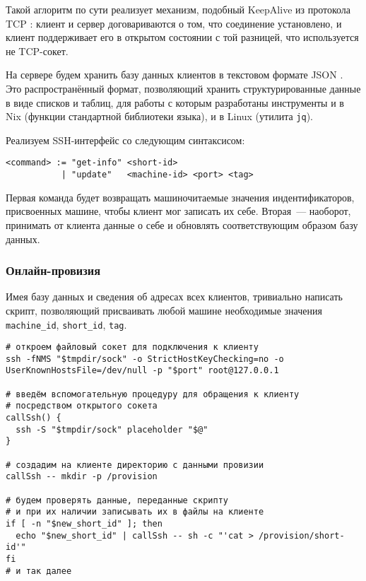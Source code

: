Такой аглоритм по сути реализует механизм, подобный  KeepAlive из протокола TCP \cite{TCPKeepalive}: клиент и сервер договариваются о том, что соединение установлено, и клиент поддерживает его в открытом состоянии с той разницей, что используется не TCP-сокет.

На сервере будем хранить базу данных клиентов в текстовом формате JSON \cite{JSON}. Это распространённый формат, позволяющий хранить структурированные данные в виде списков и таблиц, для работы с которым разработаны инструменты и в Nix (функции стандартной библиотеки языка), и в Linux (утилита \texttt{jq}).

Реализуем SSH-интерфейс со следующим синтаксисом:

\begin{lstlisting}[caption={Синтаксис обработчика SSH-соединений для провизии}]
<command> := "get-info" <short-id>
           | "update"   <machine-id> <port> <tag>
\end{lstlisting}

Первая команда будет возвращать машиночитаемые значения индентификаторов, присвоенных машине, чтобы клиент мог записать их себе. Вторая~--- наоборот, принимать от клиента данные о себе и обновлять соответствующим образом базу данных.

\subsubsection{Онлайн-провизия}

Имея базу данных и сведения об адресах всех клиентов, тривиально написать скрипт, позволяющий присваивать любой машине необходимые значения \texttt{machine\_id}, \texttt{short\_id}, \texttt{tag}.

\begin{lstlisting}[caption={Скрипт \texttt{remote-customize.sh} для онлайн-провизии (отрывок)}]
# откроем файловый сокет для подключения к клиенту
ssh -fNMS "$tmpdir/sock" -o StrictHostKeyChecking=no -o UserKnownHostsFile=/dev/null -p "$port" root@127.0.0.1

# введём вспомогательную процедуру для обращения к клиенту
# посредством открытого сокета
callSsh() {
  ssh -S "$tmpdir/sock" placeholder "$@"
}

# создадим на клиенте директорию с данными провизии
callSsh -- mkdir -p /provision

# будем проверять данные, переданные скрипту
# и при их наличии записывать их в файлы на клиенте
if [ -n "$new_short_id" ]; then
  echo "$new_short_id" | callSsh -- sh -c "'cat > /provision/short-id'"
fi
# и так далее
\end{lstlisting}

